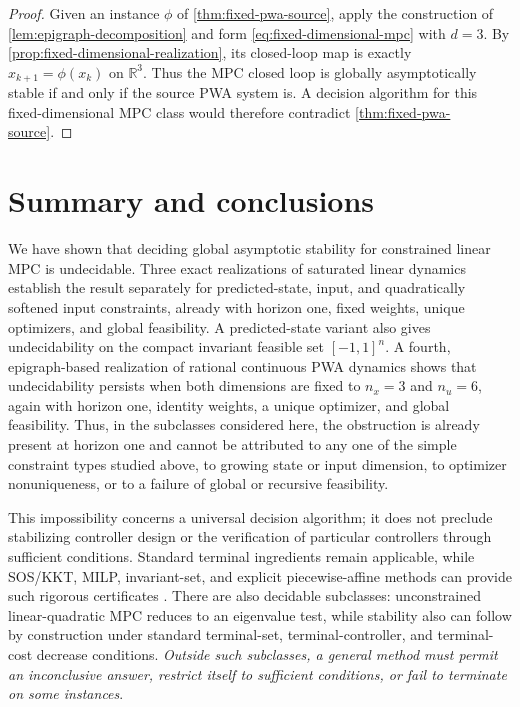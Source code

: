 \documentclass{IEEEtran}
\theoremstyle{remark}
\newcommand{\R}{\mathbb{R}}
\begin{document}
\begin{proof}
Given an instance $\phi$ of \cref{thm:fixed-pwa-source}, apply the construction of \cref{lem:epigraph-decomposition} and form
\eqref{eq:fixed-dimensional-mpc} with $d=3$.  By
\cref{prop:fixed-dimensional-realization}, its closed-loop map is exactly
$x_{k+1}=\phi(x_k)$ on $\R^3$.  Thus the MPC closed loop is globally
asymptotically stable if and only if the source PWA system is.  A decision
algorithm for this fixed-dimensional MPC class would therefore contradict
\cref{thm:fixed-pwa-source}.
\end{proof}

\section{Summary and conclusions}

We have shown that deciding global asymptotic stability for constrained linear MPC is undecidable.  Three exact realizations of saturated linear dynamics establish the result separately for predicted-state, input, and quadratically softened input constraints, already with horizon one, fixed weights, unique optimizers, and global feasibility.  A predicted-state variant also gives undecidability on the compact invariant feasible set $[-1,1]^n$.  A fourth, epigraph-based realization of rational continuous PWA dynamics shows that undecidability persists when both dimensions are fixed to $n_x=3$ and $n_u=6$, again with horizon one, identity weights, a unique optimizer, and global feasibility.  Thus, in the subclasses considered here, the obstruction is already present at horizon one and cannot be attributed to any one of the simple constraint types studied above, to growing state or input dimension, to optimizer nonuniqueness, or to a failure of global or recursive feasibility.

This impossibility concerns a universal decision algorithm; it does not preclude stabilizing controller design or the verification of particular controllers through sufficient conditions.  Standard terminal ingredients remain applicable, while SOS/KKT, MILP, invariant-set, and explicit piecewise-affine methods can provide such rigorous certificates \cite{KordaJones2017,SimonLofberg2016}.  There are also decidable subclasses: unconstrained linear-quadratic MPC reduces to an eigenvalue test, while stability also can follow by construction under standard terminal-set, terminal-controller, and terminal-cost decrease conditions.  \emph{Outside such subclasses, a general method must permit an inconclusive answer, restrict itself to sufficient conditions, or fail to terminate on some instances}.
\end{document}
